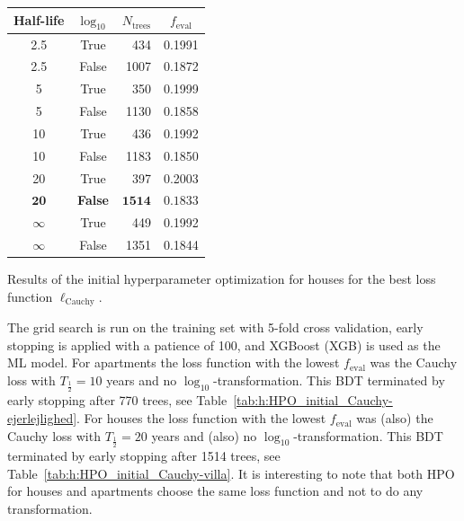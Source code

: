 \begin{margintable}[0.5cm]
  \begin{tabular}{@{}ccrc@{}}
    Half-life & $\log_{10}$ & $N_\mathrm{trees}$ & $f_\mathrm{eval}$ \\
    \midrule
    \num{2.5} & True & \num{434} & \num{0.1991} \\
    \num{2.5} & False & \num{1007} & \num{0.1872} \\
    \num{5} & True & \num{350} & \num{0.1999} \\
    \num{5} & False & \num{1130} & \num{0.1858} \\
    \num{10} & True & \num{436} & \num{0.1992} \\
    \num{10} & False & \num{1183} & \num{0.1850} \\
    \num{20} & True & \num{397} & \num{0.2003} \\
    $\mathbf{20}$ & \textbf{False} & $\mathbf{1514}$ & $\mathbf{0.1833}$ \\
    $\infty$ & True & \num{449} & \num{0.1992} \\
    $\infty$ & False & \num{1351} & \num{0.1844} \\
  \end{tabular}
  \vspace{3mm}
  \caption[Results from the Initial Hyperparameter Optimization for Houses]{\label{tab:h:HPO_initial_Cauchy-villa}Results of the initial hyperparameter optimization for houses for the best loss function $\ell_\mathrm{Cauchy}$.}
\end{margintable}


The grid search is run on the training set with \num{5}-fold cross validation, early stopping is applied with a patience of \num{100}, and XGBoost \autocite{chenXGBoostScalableTree2016} (XGB) is used as the ML model. For apartments the loss function with the lowest $f_\mathrm{eval}$ was the Cauchy loss with $T_{\frac{1}{2}}=10$ years and no $\log_{10}$-transformation. This BDT terminated by early stopping after \num{770} trees, see Table~\ref{tab:h:HPO_initial_Cauchy-ejerlejlighed}. 
For houses the loss function with the lowest $f_\mathrm{eval}$ was (also) the Cauchy loss with $T_{\frac{1}{2}}=20$ years and (also) no $\log_{10}$-transformation. This BDT terminated by early stopping after \num{1514} trees, see Table~\ref{tab:h:HPO_initial_Cauchy-villa}. 
It is interesting to note that both HPO for houses and apartments choose the same loss function and not to do any transformation. 

